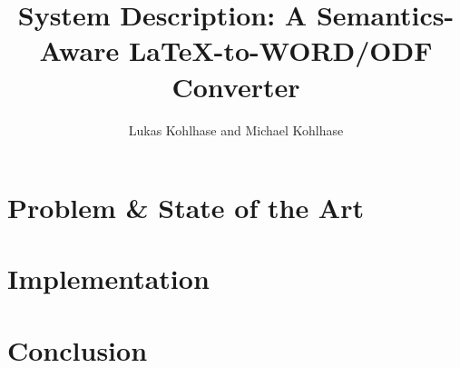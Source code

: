 \documentclass[draft]{llncs}
\title{System Description: A Semantics-Aware {\LaTeX}-to-WORD/ODF Converter}
\author{Lukas Kohlhase and Michael Kohlhase}
\institute{
  Math/CS, Jacobs University Bremen}
\begin{document}
\maketitle
\begin{abstract}
\end{abstract}

\section{Problem \& State of the Art}\label{sec:intro}

\section{Implementation}\label{sec:impl}

\section{Conclusion}\label{sec:concl}

\printbibliography
\end{document}
